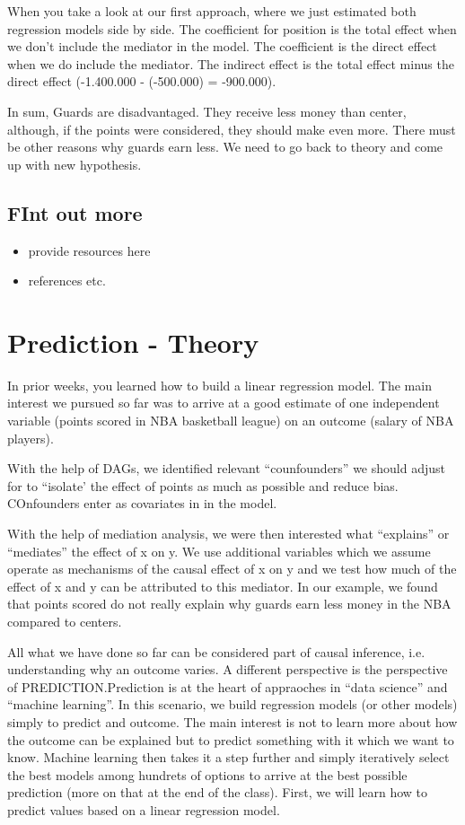 \documentclass[
]{book}
\providecommand{\tightlist}{%
  \setlength{\itemsep}{0pt}\setlength{\parskip}{0pt}}
\begin{document}
When you take a look at our first approach, where we just estimated both regression models side by side. The coefficient for position is the total effect when we don't include the
mediator in the model. The coefficient is the direct effect when we do include the mediator.
The indirect effect is the total effect minus the direct effect (-1.400.000 - (-500.000) = -900.000).

In sum, Guards are disadvantaged. They receive less money than center, although, if the points were considered, they should make even more. There must be other reasons why guards earn less. We need to go back to theory and come up with new hypothesis.

\hypertarget{fint-out-more}{%
\section{FInt out more}\label{fint-out-more}}

\begin{itemize}
\tightlist
\item
  provide resources here
\item
  references etc.
\end{itemize}

\hypertarget{pm-t}{%
\chapter{Prediction - Theory}\label{pm-t}}

In prior weeks, you learned how to build a linear regression model. The main interest
we pursued so far was to arrive at a good estimate of one independent variable (points scored in NBA basketball league) on an outcome (salary of NBA players).

With the help of DAGs, we identified relevant ``counfounders'' we should adjust for to ``isolate' the effect of points as much as possible and reduce bias. COnfounders enter as covariates in in the model.

With the help of mediation analysis, we were then interested what ``explains'' or ``mediates'' the effect of x on y. We use additional variables which we assume operate as mechanisms of the causal effect of x on y and we test how much of the effect of x and y can be attributed to this mediator. In our example, we found that points scored do not really explain why guards earn less money in the NBA compared to centers.

All what we have done so far can be considered part of causal inference, i.e.
understanding why an outcome varies. A different perspective is the perspective of PREDICTION.Prediction is at the heart of appraoches in ``data science'' and ``machine learning''.
In this scenario, we build regression models (or other models) simply to predict and outcome. The main interest is not to learn more about how the outcome can be explained but to predict something with it which we want to know. Machine learning then takes it a step further and simply iteratively select the best models among hundrets of options to arrive at the best possible prediction (more on that at the end of the class). First, we will learn how to predict values based on a linear regression model.
\end{document}

